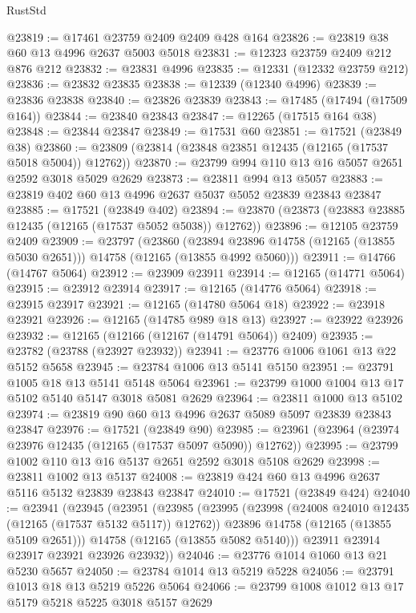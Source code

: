 \begin{lexlean}{RustStd}
\begin{coremodule}
@23819 := @17461 @23759 @2409 @2409 @428 @164
@23826 := @23819 @38 @60 @13 @4996 @2637 @5003 @5018
@23831 := @12323 @23759 @2409 @212 @876 @212
@23832 := @23831 @4996
@23835 := @12331 (@12332 @23759 @212)
@23836 := @23832 @23835
@23838 := @12339 (@12340 @4996)
@23839 := @23836 @23838
@23840 := @23826 @23839
@23843 := @17485 (@17494 (@17509 @164))
@23844 := @23840 @23843
@23847 := @12265 (@17515 @164 @38)
@23848 := @23844 @23847
@23849 := @17531 @60
@23851 := @17521 (@23849 @38)
@23860 := @23809 (@23814 (@23848 @23851 @12435 (@12165 (@17537 @5018 @5004)) @12762))
@23870 := @23799 @994 @110 @13 @16 @5057 @2651 @2592 @3018 @5029 @2629
@23873 := @23811 @994 @13 @5057
@23883 := @23819 @402 @60 @13 @4996 @2637 @5037 @5052 @23839 @23843 @23847
@23885 := @17521 (@23849 @402)
@23894 := @23870 (@23873 (@23883 @23885 @12435 (@12165 (@17537 @5052 @5038)) @12762))
@23896 := @12105 @23759 @2409
@23909 := @23797
    (@23860
      (@23894 @23896 @14758 (@12165 (@13855 @5030 @2651)))
      @14758
      (@12165 (@13855 @4992 @5060)))
@23911 := @14766 (@14767 @5064)
@23912 := @23909 @23911
@23914 := @12165 (@14771 @5064)
@23915 := @23912 @23914
@23917 := @12165 (@14776 @5064)
@23918 := @23915 @23917
@23921 := @12165 (@14780 @5064 @18)
@23922 := @23918 @23921
@23926 := @12165 (@14785 @989 @18 @13)
@23927 := @23922 @23926
@23932 := @12165 (@12166 (@12167 (@14791 @5064)) @2409)
@23935 := @23782 (@23788 (@23927 @23932))
@23941 := @23776 @1006 @1061 @13 @22 @5152 @5658
@23945 := @23784 @1006 @13 @5141 @5150
@23951 := @23791 @1005 @18 @13 @5141 @5148 @5064
@23961 := @23799 @1000 @1004 @13 @17 @5102 @5140 @5147 @3018 @5081 @2629
@23964 := @23811 @1000 @13 @5102
@23974 := @23819 @90 @60 @13 @4996 @2637 @5089 @5097 @23839 @23843 @23847
@23976 := @17521 (@23849 @90)
@23985 := @23961 (@23964 (@23974 @23976 @12435 (@12165 (@17537 @5097 @5090)) @12762))
@23995 := @23799 @1002 @110 @13 @16 @5137 @2651 @2592 @3018 @5108 @2629
@23998 := @23811 @1002 @13 @5137
@24008 := @23819 @424 @60 @13 @4996 @2637 @5116 @5132 @23839 @23843 @23847
@24010 := @17521 (@23849 @424)
@24040 := @23941
    (@23945
      (@23951
        (@23985
          (@23995
            (@23998 (@24008 @24010 @12435 (@12165 (@17537 @5132 @5117)) @12762))
            @23896
            @14758
            (@12165 (@13855 @5109 @2651)))
          @14758
          (@12165 (@13855 @5082 @5140)))
        @23911
        @23914
        @23917
        @23921
        @23926
        @23932))
@24046 := @23776 @1014 @1060 @13 @21 @5230 @5657
@24050 := @23784 @1014 @13 @5219 @5228
@24056 := @23791 @1013 @18 @13 @5219 @5226 @5064
@24066 := @23799 @1008 @1012 @13 @17 @5179 @5218 @5225 @3018 @5157 @2629

\end{coremodule}
\end{lexlean}
